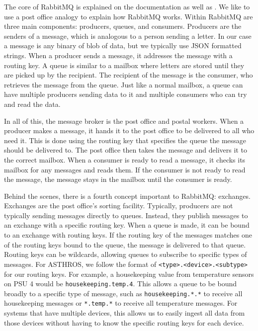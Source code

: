 The core of RabbitMQ is explained on the documentation as well as \cite{toshev2015learning}.
We like to use a post office analogy to explain how RabbitMQ works.
Within RabbitMQ are three main components: producers, queues, and consumers. 
Producers are the senders of a message, which is analogous to a person sending a letter.
In our case a message is any binary of blob of data, but we typically use JSON formatted strings.
When a producer sends a message, it addresses the message with a routing key.
A queue is similar to a mailbox where letters are stored until they are picked up by the recipient.
The recipient of the message is the consumer, who retrieves the message from the queue.
Just like a normal mailbox, a queue can have multiple producers sending data to it and multiple consumers who can try and read the data.

In all of this, the message broker is the post office and postal workers.
When a producer makes a message, it hands it to the post office to be delivered to all who need it.
This is done using the routing key that specifies the queue the message should be delivered to.
The post office then takes the message and delivers it to the correct mailbox. 
When a consumer is ready to read a message, it checks its mailbox for any messages and reads them.
If the consumer is not ready to read the message, the message stays in the mailbox until the consumer is ready.

Behind the scenes, there is a fourth concept important to RabbitMQ: exchanges.
Exchanges are the post office's sorting facility.
Typically, producers are not typically sending messages directly to queues. 
Instead, they publish messages to an exchange with a specific routing key.
When a queue is made, it can be bound to an exchange with routing keys.
If the routing key of the messages matches one of the routing keys bound to the queue, the message is delivered to that queue.
Routing keys can be wildcards, allowing queues to subscribe to specific types of messages. 
For ASTHROS, we follow the format of \texttt{<type>.<device>.<subtype>} for our routing keys.
For example, a housekeeping value from temperature sensors on PSU 4 would be \texttt{housekeeping.temp.4}.
This allows a queue to be bound broadly to a specific type of message, such as \texttt{housekeeping.*.*} to receive all housekeeping messages or \texttt{*.temp.*} to receive all temperature messages.
For systems that have multiple devices, this allows us to easily ingest all data from those devices without having to know the specific routing keys for each device.

